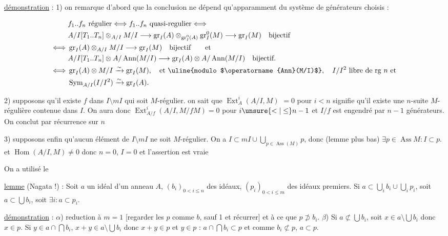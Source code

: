 

\uline{démonstration} : 1) on remarque d'abord que la conclusion ne dépend qu'apparamment du système de générateurs choisis : 

\[
\begin{aligned}
& f_1..f_n\ \text{régulier}\Longleftrightarrow f_1..f_n\ \text{quasi-regulier}\Longleftrightarrow\\
& A/I[T_1..T_n]\otimes_{A/I}M/I\longrightarrow\operatorname{gr}_I(A)\otimes_{\operatorname{gr}_I^0(A)}\operatorname{gr}_I^0(M)\longrightarrow\operatorname{gr}_I(M)\quad\text{bijectif}\\
\Longleftrightarrow{}&\operatorname{gr}_I(A)\otimes_{A/I}M/I\longrightarrow\operatorname{gr}_I(M)\quad\text{bijectif}\qquad\text{et}\\
& A/I[T_1..T_n]\otimes A/\operatorname{Ann}(M/I)\longrightarrow\operatorname{gr}_I(A)\otimes A/\operatorname{Ann}(M/I)\quad\text{bijectif.}\\
\Longleftrightarrow{}&\operatorname{gr}_I(A)\otimes M/I\xrightarrow{\sim}\operatorname{gr}_I(M),\quad\text{et \uline{modulo $\operatorname{Ann}(M/I)$}},\quad I/I^2\ \text{libre de rg }n\text{ et}\\
&\operatorname{Sym}_{A/I}(I/I^2)\xrightarrow{\sim}\operatorname{gr}_I(A).
\end{aligned}
\]

2) supposons qu'il existe $f$ dans $I\setminus mI$ qui soit $M$-régulier. on sait que $\operatorname{Ext}^i_A(A/I,M)$  $=0$ pour $i<n$ signifie qu'il existe une $n$-suite $M$-régulière contenue dans $I$. On aura donc $\operatorname{Ext}^i_{A/f}(A/I,M/fM)=0$ pour $i\unsure{<|\leq}n-1$ et $I/f$ est engendré par $n-1$ générateurs. On conclut par récurrence sur $n$

3) supposons enfin qu'aucun élément de $I\setminus mI$ ne soit $M$-régulier. On a $I\subset mI\cup\bigcup_{p\in\operatorname{Ass}(M)}p$, donc (lemme plus bas) $\exists p\in\operatorname{Ass}M:I\subset p$. et $\operatorname{Hom}(A/I,M)\ne0$ donc $n=0$, $I=0$ et l'assertion est vraie

On a utilisé le

\uline{lemme} (Nagata !) : Soit $a$ un idéal d'un anneau $A$, $(b_i)_{0<i\leq n}$ des idéaux, $(p_i)_{0<i\leq m}$ des idéaux premiers. Si $a\subset\bigcup_i b_i\cup\bigcup_i p_i$, soit $a\subset\bigcup b_i$, soit $\exists i:a\subset p_i$.

\uline{démonstration} : $\alpha$) reduction à $m=1$ [regarder les $p$ comme $b$, sauf 1 et récurrer] et à ce que $p\not\supset b_i$. $\beta$) Si $a\not\subset\bigcup b_i$, soit $x\in a\setminus\bigcup b_i$ donc $x\in p$. Si $y\in a\cap\bigcap b_i$, $x+y\in a\setminus\bigcup b_i$ donc $x+y\in p$ et $y\in p$ : $a\cap\bigcap b_i\subset p$ et comme $b_i\not\subset p$, $a\subset p$.


